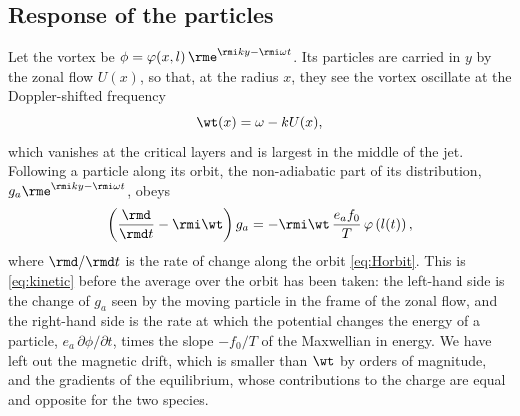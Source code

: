 \subsection{Response of the particles}

Let the vortex be \(\phi = \varphi(x, l)\,\rme^{\rmi ky - \rmi\omega t}\). Its particles are carried in \(y\) by the zonal flow \(U(x)\), so that, at the radius \(x\), they see the vortex oscillate at the Doppler-shifted frequency
\begin{equation}
\wt(x) = \omega - kU(x),
\label{eq:Hdoppler}
\end{equation}
which vanishes at the critical layers and is largest in the middle of the jet. Following a particle along its orbit, the non-adiabatic part of its distribution, \(g_a\rme^{\rmi ky - \rmi\omega t}\), obeys
\begin{equation}
\left(\frac{\rmd}{\rmd t} - \rmi\wt\right)g_a = -\rmi\wt\,\frac{e_af_0}{T}\,\varphi\left(l(t)\right),
\label{eq:Hkinetic}
\end{equation}
where \(\rmd/\rmd t\) is the rate of change along the orbit \cref{eq:Horbit}. This is \cref{eq:kinetic} before the average over the orbit has been taken: the left-hand side is the change of \(g_a\) seen by the moving particle in the frame of the zonal flow, and the right-hand side is the rate at which the potential changes the energy of a particle, \(e_a\,\partial\phi/\partial t\), times the slope \(-f_0/T\) of the Maxwellian in energy. We have left out the magnetic drift, which is smaller than \(\wt\) by orders of magnitude, and the gradients of the equilibrium, whose contributions to the charge are equal and opposite for the two species.

